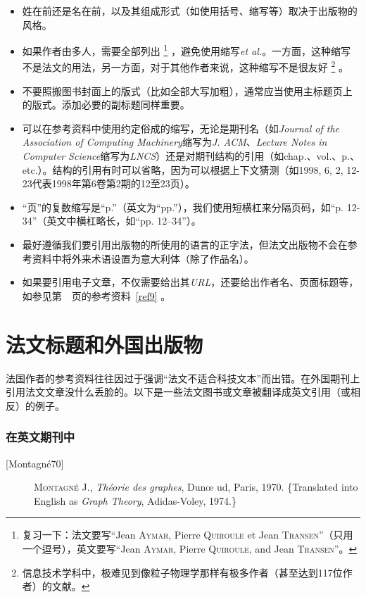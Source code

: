 \begin{itemize}
    \item 姓在前还是名在前，以及其组成形式（如使用括号、缩写等）取决于出版物的风格。
    \item 如果作者由多人，需要全部列出
        \footnote{复习一下：法文要写``Jean \textsc{Aymar}, Pierre \textsc{Quiroule} et Jean \textsc{Transen}''（只用一个逗号），英文要写``Jean \textsc{Aymar}, Pierre \textsc{Quiroule}, and Jean \textsc{Transen}''。}
    ，避免使用缩写\emph{et al.}。一方面，这种缩写不是法文的用法，另一方面，对于其他作者来说，这种缩写不是很友好
        \footnote{信息技术学科中，极难见到像粒子物理学那样有极多作者（甚至达到117位作者）的文献。}
    。
    \item 不要照搬图书封面上的版式（比如全部大写加粗），通常应当使用主标题页上的版式。添加必要的副标题同样重要。
    \item 可以在参考资料中使用约定俗成的缩写，无论是期刊名（如\emph{Journal of the Association of Computing Machinery}缩写为\emph{J. ACM}、\emph{Lecture Notes in Computer Science}缩写为\emph{LNCS}）还是对期刊结构的引用（如chap.、vol.、p.、etc.）。结构的引用有时可以省略，因为可以根据上下文猜测（如1998, 6, 2, 12-23代表1998年第6卷第2期的12至23页）。
    \item ``页''的复数缩写是``p.''（英文为``pp.''），我们使用短横杠来分隔页码，如``p. 12-34''（英文中横杠略长，如``pp. 12--34''）。
    \item 最好遵循我们要引用出版物的所使用的语言的正字法，但法文出版物不会在参考资料中将外来术语设置为意大利体（除了作品名）。
    \item 如果要引用电子文章，不仅需要给出其\emph{URL}，还要给出作者名、页面标题等，如参见第~\pageref{ref9}~页的参考资料~\ref{ref9} 。
\end{itemize}

\section{法文标题和外国出版物}

法国作者的参考资料往往因过于强调``法文不适合科技文本''而出错。在外国期刊上引用法文文章没什么丢脸的。以下是一些法文图书或文章被翻译成英文引用（或相反）的例子。

\subsubsection*{在英文期刊中}

\begin{description}
    \item[{[Montagné70]}] \textsc{Montagné} J., \emph{Théorie des graphes}, Dunœ ud, Paris, 1970. \{Translated into English as \emph{Graph Theory}, Adidas-Voley, 1974.\}
\end{description}

